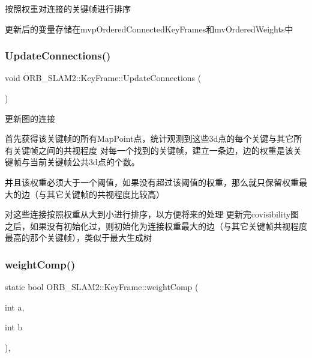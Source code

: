 按照权重对连接的关键帧进行排序 

更新后的变量存储在mvp\+Ordered\+Connected\+Key\+Frames和mv\+Ordered\+Weights中 \mbox{\label{class_o_r_b___s_l_a_m2_1_1_key_frame_afe7026956c91d4e0a01812be9dc7e8d5}} 
\subsubsection{\texorpdfstring{Update\+Connections()}{UpdateConnections()}}
{\footnotesize\ttfamily void O\+R\+B\+\_\+\+S\+L\+A\+M2\+::\+Key\+Frame\+::\+Update\+Connections (\begin{DoxyParamCaption}{ }\end{DoxyParamCaption})}



更新图的连接 


\begin{DoxyEnumerate}
\item 首先获得该关键帧的所有\+Map\+Point点，统计观测到这些3d点的每个关键与其它所有关键帧之间的共视程度 对每一个找到的关键帧，建立一条边，边的权重是该关键帧与当前关键帧公共3d点的个数。
\item 并且该权重必须大于一个阈值，如果没有超过该阈值的权重，那么就只保留权重最大的边（与其它关键帧的共视程度比较高）
\item 对这些连接按照权重从大到小进行排序，以方便将来的处理 更新完covisibility图之后，如果没有初始化过，则初始化为连接权重最大的边（与其它关键帧共视程度最高的那个关键帧），类似于最大生成树 
\end{DoxyEnumerate}\mbox{\label{class_o_r_b___s_l_a_m2_1_1_key_frame_ad2d0287d1ca4a91cd9d684754c84a08b}} 
\subsubsection{\texorpdfstring{weight\+Comp()}{weightComp()}}
{\footnotesize\ttfamily static bool O\+R\+B\+\_\+\+S\+L\+A\+M2\+::\+Key\+Frame\+::weight\+Comp (\begin{DoxyParamCaption}\item[{int}]{a,  }\item[{int}]{b }\end{DoxyParamCaption})\hspace{0.3cm}{\ttfamily [inline]}, {\ttfamily [static]}}



